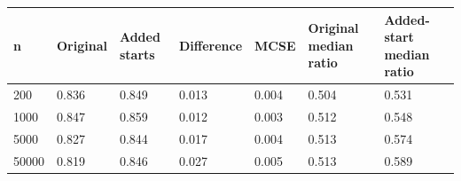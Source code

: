 \begin{tabular}{lllllll}
\toprule
n & Original & Added starts & Difference & MCSE & Original median ratio & Added-start median ratio \\
\midrule
200 & 0.836 & 0.849 & 0.013 & 0.004 & 0.504 & 0.531 \\
1000 & 0.847 & 0.859 & 0.012 & 0.003 & 0.512 & 0.548 \\
5000 & 0.827 & 0.844 & 0.017 & 0.004 & 0.513 & 0.574 \\
50000 & 0.819 & 0.846 & 0.027 & 0.005 & 0.513 & 0.589 \\
\bottomrule
\end{tabular}
